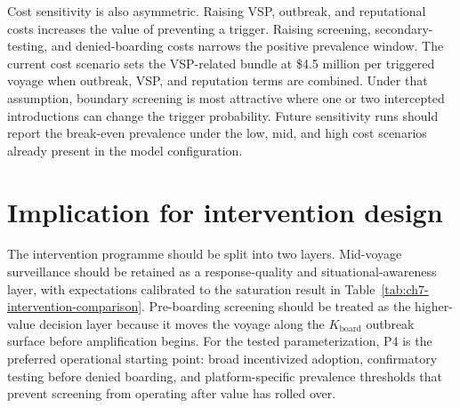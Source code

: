 Cost sensitivity is also asymmetric.
Raising VSP, outbreak, and reputational costs increases the value of preventing a trigger.
Raising screening, secondary-testing, and denied-boarding costs narrows the positive prevalence
window.
The current cost scenario sets the VSP-related bundle at \$4.5 million per triggered voyage when
outbreak, VSP, and reputation terms are combined.
Under that assumption, boundary screening is most attractive where one or two intercepted
introductions can change the trigger probability.
Future sensitivity runs should report the break-even prevalence under the low, mid, and high cost
scenarios already present in the model configuration.

\section{Implication for intervention design}
The intervention programme should be split into two layers.
Mid-voyage surveillance should be retained as a response-quality and situational-awareness layer,
with expectations calibrated to the saturation result in Table~\ref{tab:ch7-intervention-comparison}.
Pre-boarding screening should be treated as the higher-value decision layer because it moves the
voyage along the $K_{\mathrm{board}}$ outbreak surface before amplification begins.
For the tested parameterization, P4 is the preferred operational starting point: broad incentivized
adoption, confirmatory testing before denied boarding, and platform-specific prevalence thresholds
that prevent screening from operating after value has rolled over.
